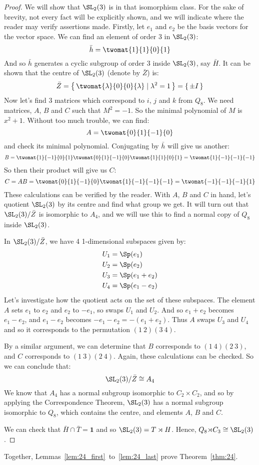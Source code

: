 \begin{proof}
    We will show that \(\SL_2(3)\) is in that isomorphism class.
    For the sake of brevity, not every fact will be explicitly shown, and we will indicate where the reader may verify
    assertions made.
    Firstly, let \(e_1\) and \(e_2\) be the basis vectors for the vector space.
    We can find an element of order 3 in \(\SL_2(3)\):
    \[\bar{h} = \twomat{1}{1}{0}{1}\]
    And so \(\bar{h}\) generates a cyclic subgroup of order 3 inside \(\SL_2(3)\), say \(\bar{H}\).
    It can be shown that the centre of \(\SL_2(3)\) (denote by \(\bar{Z}\)) is:
    \[ \bar{Z} = \left\{\,\twomat{\lambda}{0}{0}{\lambda} \mid \lambda^2 = 1\,\right\} = \{\,\pm I\,\} \]
    Now let's find 3 matrices which correspond to \(i\), \(j\) and \(k\) from \(Q_8\).
    We need matrices, \(A\), \(B\) and \(C\) such that \(M^2 = -1\).
    So the minimal polynomial of \(M\) is \(x^2 + 1\).
    Without too much trouble, we can find:
    \[ A = \twomat{0}{1}{-1}{0} \]
    and check its minimal polynomial.
    Conjugating by \(\bar{h}\) will give us another:
    \[ B = \twomat{1}{-1}{0}{1}\twomat{0}{1}{-1}{0}\twomat{1}{1}{0}{1} = \twomat{1}{-1}{-1}{-1} \]
    So then their product will give us \(C\):
    \[ C = AB = \twomat{0}{1}{-1}{0}\twomat{1}{-1}{-1}{-1} = \twomat{-1}{-1}{-1}{1} \]
    These calculations can be verified by the reader.
    With \(A\), \(B\) and \(C\) in hand, let's quotient \(\SL_2(3)\) by its centre and find what group we get.
    It will turn out that \(\SL_2(3)/\bar{Z}\) is isomorphic to \(A_4\), and we will use this to find a normal copy of
    \(Q_8\) inside \(\SL_2(3)\).

    In \(\SL_2(3)/\bar{Z}\), we have 4 1-dimensional subspaces given by:
    \begin{align*}
        U_1 &= \Sp(e_1) \\
        U_2 &= \Sp(e_2) \\
        U_3 &= \Sp(e_1 + e_2) \\
        U_4 &= \Sp(e_1 - e_2)
    \end{align*}
    Let's investigate how the quotient acts on the set of these subspaces.
    The element \(A\) sets \(e_1\) to \(e_2\) and \(e_2\) to \(-e_1\), so swaps \(U_1\) and \(U_2\).
    And so \(e_1 + e_2\) becomes \(e_1 - e_2\), and \(e_1 - e_2\) becomes \(-e_1 - e_2 = -(e_1 + e_2)\).
    Thus \(A\) swaps \(U_{3}\) and \(U_4\) and so it corresponds to the permutation \((1\ 2)(3\ 4)\).

    By a similar argument, we can determine that \(B\) corresponds to \((1\ 4)(2\ 3)\), and \(C\) corresponds to
    \((1\ 3)(2\ 4)\).
    Again, these calculations can be checked.
    So we can conclude that:
    \[\SL_2(3)/\bar{Z} \cong A_4\]
    We know that \(A_4\) has a normal subgroup isomorphic to \(C_2 {\times} C_{2}\), and so by applying the
    Correspondence Theorem, \(\SL_2(3)\) has a normal subgroup isomorphic to \(Q_8\), which contains the centre, and
    elements \(A\), \(B\) and \(C\).

    We can check that \(\bar{H} \cap \bar{T} = \bm{1}\) and so \(\SL_2(3) = T \rtimes H\).
    Hence, \(Q_8 {\rtimes} C_3 \cong \SL_2(3)\).
\end{proof}

Together, Lemmas~\ref{lem:24_first}~to~\ref{lem:24_last} prove Theorem~\ref{thm:24}.

